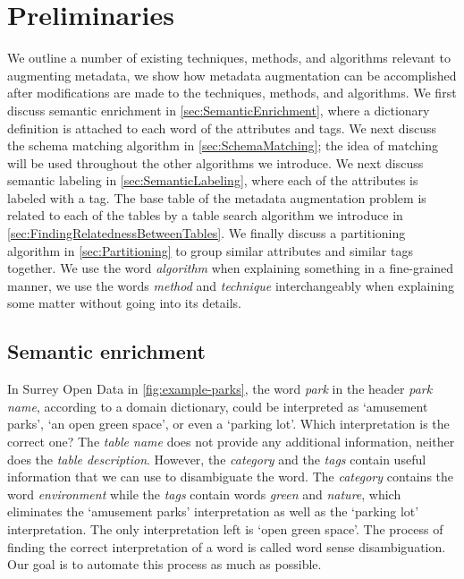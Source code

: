 
\chapter{Preliminaries}
\label{ch:Preliminaries}

We outline a number of existing techniques, methods, and algorithms relevant to augmenting metadata, we show how metadata augmentation can be accomplished after modifications are made to the techniques, methods, and algorithms. We first discuss semantic enrichment in \autoref{sec:SemanticEnrichment}, where a dictionary definition is attached to each word of the attributes and tags. We next discuss the schema matching algorithm in \autoref{sec:SchemaMatching}; the idea of matching will be used throughout the other algorithms we introduce. We next discuss semantic labeling in \autoref{sec:SemanticLabeling}, where each of the attributes is labeled with a tag. The base table of the metadata augmentation problem is related to each of the tables by a table search algorithm we introduce in \autoref{sec:FindingRelatednessBetweenTables}. We finally discuss a partitioning algorithm in \autoref{sec:Partitioning} to group similar attributes and similar tags together. We use the word \textit{algorithm} when explaining something in a fine-grained manner, we use the words \textit{method} and \textit{technique} interchangeably when explaining some matter without going into its details.

\section{Semantic enrichment}
\label{sec:SemanticEnrichment}

In Surrey Open Data in \autoref{fig:example-parks}, the word \textit{park} in the header \textit{park name}, according to a domain dictionary, could be interpreted as `amusement parks', `an open green space', or even a `parking lot'. Which interpretation is the correct one? The \textit{table name} does not provide any additional information, neither does the \textit{table description}. However, the \textit{category} and the \textit{tags} contain useful information that we can use to disambiguate the word. The \textit{category} contains the word \textit{environment} while the \textit{tags} contain words \textit{green} and \textit{nature}, which eliminates the `amusement parks' interpretation as well as the `parking lot' interpretation. The only interpretation left is `open green space'. The process of finding the correct interpretation of a word is called word sense disambiguation. Our goal is to automate this process as much as possible.

